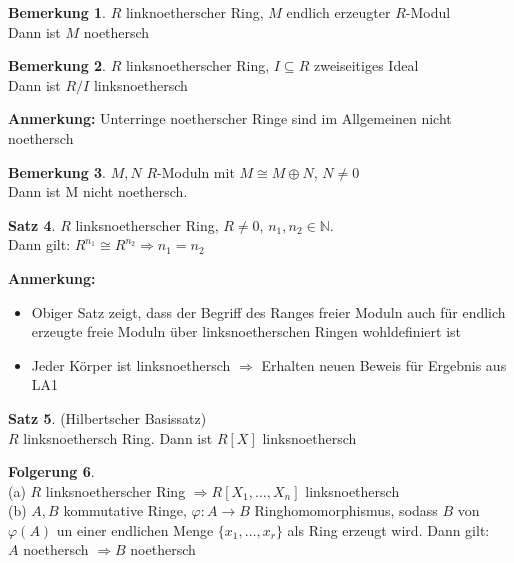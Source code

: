 \documentclass[10pt,a4paper,numbers=endperiod]{scrreprt}
\theoremstyle{definition}
\newtheorem{satz}{Satz}[section]
\newtheorem{bem}[satz]{Bemerkung}
\newtheorem{folg}[satz]{Folgerung}
\def\NN{{\mathbb N}}
\begin{document}
\begin{bem}
	$R$ linknoetherscher Ring, $M$ endlich erzeugter $R$-Modul\\
	Dann ist $M$ noethersch
\end{bem}

\begin{bem}
	$R$ linksnoetherscher Ring, $I \subseteq R$ zweiseitiges Ideal\\
	Dann ist $R/I$ linksnoethersch
\end{bem}

\textbf{Anmerkung:} Unterringe noetherscher Ringe sind im Allgemeinen nicht noethersch

\begin{bem}
	$M, N$ $R$-Moduln mit $M \cong M \oplus N$, $N \neq 0$\\
	Dann ist M nicht noethersch.
\end{bem}

\begin{satz}
	$R$ linksnoetherscher Ring, $R \neq 0$, $n_1, n_2 \in \NN$.\\
	Dann gilt: $R^{n_1} \cong R^{n_2} \Rightarrow n_1 = n_2$
\end{satz}

\textbf{Anmerkung:} \begin{itemize}
		\item Obiger Satz zeigt, dass der Begriff des Ranges freier Moduln auch für endlich erzeugte freie Moduln über linksnoetherschen Ringen wohldefiniert ist
		\item Jeder Körper ist linksnoethersch $\Rightarrow$ Erhalten neuen Beweis für Ergebnis aus LA1 
\end{itemize}

\begin{satz}
	(Hilbertscher Basissatz)\\
	$R$ linksnoethersch Ring. Dann ist $R[X]$ linksnoethersch
\end{satz}

\begin{folg}
	$ $\\
	(a) $R$ linksnoetherscher Ring $\Rightarrow R[X_1, \ldots, X_n]$ linksnoethersch\\
	(b) $A, B$ kommutative Ringe, $\varphi: A \rightarrow B$ Ringhomomorphismus, sodass $B$ von $\varphi(A)$ un einer endlichen Menge $\{x_1, \ldots, x_r\}$ als Ring erzeugt wird. Dann gilt:\\
	$A$ noethersch $\Rightarrow B$ noethersch
\end{folg}
\end{document}
